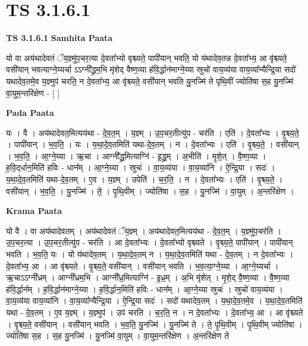 \documentclass[17pt]{extarticle}
\begin{document}
\section{ TS 3.1.6.1 }

\textbf{TS 3.1.6.1 } \newline
\textbf{Samhita Paata} \newline

यो वा अय॑थादेवतं ॅय॒ज्ञ्मु॑प॒चर॒त्या दे॒वता᳚भ्यो वृश्च्यते॒ पापी॑यान् भवति॒ यो य॑थादेव॒तन्न दे॒वता᳚भ्य॒ आ वृ॑श्च्यते॒ वसी॑यान् भवत्याग्ने॒य्यर्चा ऽऽग्नी᳚द्ध्रम॒भि मृ॑शेद् वैष्ण॒व्या ह॑वि॒र्द्धान॑माग्ने॒य्या स्रुचो॑ वाय॒व्य॑या वाय॒व्या᳚न्यैन्द्रि॒या सदो॑ यथादेव॒तमे॒व य॒ज्ञ्मुप॑ चरति॒ न दे॒वता᳚भ्य॒ आ वृ॑श्च्यते॒ वसी॑यान् भवति यु॒नज्मि॑ ते पृथि॒वीं ज्योति॑षा स॒ह यु॒नज्मि॑ वा॒युम॒न्तरि॑क्षेण - [  ] \newline

\textbf{Pada Paata} \newline

यः । वै । अय॑थादेवत॒मित्यय॑था - दे॒व॒त॒म् । य॒ज्ञ्म् । उ॒प॒चर॒तीत्यु॑प - चर॑ति । एति॑ । दे॒वता᳚भ्यः । वृ॒श्च्य॒ते॒ । पापी॑यान् । भ॒व॒ति॒ । यः । य॒था॒दे॒व॒तमिति॑ यथा-दे॒व॒तम् । न । दे॒वता᳚भ्यः । एति॑ । वृ॒श्च्य॒ते॒ । वसी॑यान् । भ॒व॒ति॒ । आ॒ग्ने॒य्या । ऋ॒चा । आग्नी᳚द्ध्र॒मित्याग्नि॑ - इ॒द्ध्र॒म् । अ॒भीति॑ । मृ॒शे॒त् । वै॒ष्ण॒व्या । ह॒वि॒द्‌र्धान॒मिति॑ हविः - धान᳚म् । आ॒ग्ने॒य्या । स्रुचः॑ । वा॒य॒व्य॑या । वा॒य॒व्या॑नि । ऐ॒न्द्रि॒या । सदः॑ । य॒था॒दे॒व॒तमिति॑ यथा-दे॒व॒तम् । ए॒व । य॒ज्ञ्म् । उपेति॑ । च॒र॒ति॒ । न । दे॒वता᳚भ्यः । एति॑ । वृ॒श्च्य॒ते॒ । वसी॑यान् । भ॒व॒ति॒ । यु॒नज्मि॑ । ते॒ । पृ॒थि॒वीम् । ज्योति॑षा । स॒ह । यु॒नज्मि॑ । वा॒युम् । अ॒न्तरि॑क्षेण ।  \newline


\textbf{Krama Paata} \newline

यो वै । वा अय॑थादेवतम् । अय॑थादेवतं ॅय॒ज्ञ्म् । अय॑थादेवत॒मित्यय॑था - दे॒व॒त॒म् । य॒ज्ञ्मु॑प॒चर॑ति । उ॒प॒चर॒त्या । उ॒प॒चर॒तीत्यु॑प - चर॑ति । आ दे॒वता᳚भ्यः । दे॒वता᳚भ्यो वृश्च्यते । वृ॒श्च्य॒ते॒ पापी॑यान् । पापी॑यान् भवति । भ॒व॒ति॒ यः । यो य॑थादेव॒तम् । य॒था॒दे॒व॒तम् न । य॒था॒दे॒व॒तमिति॑ यथा - दे॒व॒तम् । न दे॒वता᳚भ्यः । दे॒वता᳚भ्य॒ आ । आ वृ॑श्च्यते । वृ॒श्च्य॒ते॒ वसी॑यान् । वसी॑यान् भवति । भ॒व॒त्या॒ग्ने॒य्या । आ॒ग्ने॒य्यर्चा । ऋ॒चाऽऽग्नी᳚ध्रम् । आग्नी᳚ध्रम॒भि । आग्नी᳚ध्र॒मित्याग्नि॑ - इ॒ध्र॒म् । अ॒भि मृ॑शेत् । मृ॒शे॒द् वै॒ष्ण॒व्या । वै॒ष्ण॒व्या ह॑वि॒र्द्धान᳚म् । ह॒वि॒र्द्धान॑माग्ने॒य्या । ह॒वि॒र्द्धान॒मिति॑ हविः - धान᳚म् । आ॒ग्ने॒य्या स्रुचः॑ । स्रुचो॑ वाय॒व्य॑या । वा॒य॒व्य॑या वाय॒व्या॑नि । वा॒य॒व्या᳚न्यैन्द्रि॒या । ऐ॒न्द्रि॒या सदः॑ । सदो॑ यथादेव॒तम् । य॒था॒दे॒व॒तमे॒व । य॒था॒दे॒व॒तमिति॑ यथा - दे॒व॒तम् । ए॒व य॒ज्ञ्म् । य॒ज्ञ्मुप॑ । उप॑ चरति । च॒र॒ति॒ न । न दे॒वता᳚भ्यः । दे॒वता᳚भ्य॒ आ । आ वृ॑श्च्यते । वृ॒श्च्य॒ते॒ वसी॑यान् । वसी॑यान् भवति । भ॒व॒ति॒ यु॒नज्मि॑ । यु॒नज्मि॑ ते । ते॒ पृ॒थि॒वीम् । पृ॒थि॒वीम् ज्योति॑षा । ज्योति॑षा स॒ह । स॒ह यु॒नज्मि॑ । यु॒नज्मि॑ वा॒युम् । वा॒युम॒न्तरि॑क्षेण । अ॒न्तरि॑क्षेण ते \newline
\end{document}
